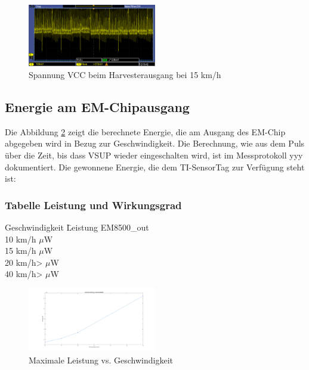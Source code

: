 \begin{figure}[ht]
    \includegraphics[width=0.5\textwidth]{4Resultate/imag/SpannungVCC.png} 
    \caption{Spannung VCC beim Harvesterausgang bei 15 km/h}
    \label{resultat_Harvester_Spannung}
\end{figure}

\newpage  %
\subsection{Energie am EM-Chipausgang}

Die Abbildung \ref{energie_resultat_harvester} zeigt die berechnete Energie, die am Ausgang des EM-Chip abgegeben wird in Bezug zur Geschwindigkeit. Die Berechnung, wie aus dem Puls über die Zeit, bis dass VSUP wieder eingeschalten wird, ist im  Messprotokoll yyy dokumentiert. Die gewonnene Energie, die dem TI-SensorTag zur Verfügung steht ist:

\subsubsection*{Tabelle Leistung und Wirkungsgrad }
\begin{tabbing}
    Geschwindigkeit \quad\= Leistung EM8500\_out \\[0.8ex]
    10 km/h     $\mu$W\\
    15 km/h    $\mu$W\\
    20 km/h>   $\mu$W\\
    40 km/h>  $\mu$W\\
\end{tabbing}  


\begin{figure}[ht]
    \includegraphics[width=0.5\textwidth]{4Resultate/imag/ResultatLeistungGeschwindigkeit.png} 
    \caption{Maximale Leistung vs. Geschwindigkeit}
    \label{energie_resultat_harvester}
\end{figure}

